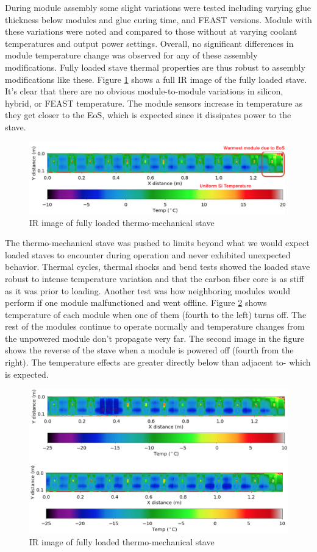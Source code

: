 During module assembly some slight variations were tested including varying glue thickness below modules and glue curing time, and FEAST versions. Module with these variations were noted and compared to those without at varying coolant temperatures and output power settings. Overall, no significant differences in module temperature change was observed for any of these assembly modifications. Fully loaded stave thermal properties are thus robust to assembly modifications like these. Figure \ref{fig:IRimagetotal} shows a full IR image of the fully loaded stave. It's clear that there are no obvious module-to-module variations in silicon, hybrid, or FEAST temperature. The module sensors increase in temperature as they get closer to the EoS, which is expected since it dissipates power to the stave.

\begin{figure}[!h]
        \centering
    \includegraphics[width=.8\textwidth]{Pictures/IRimagetotal.png}
    \caption{IR image of fully loaded thermo-mechanical stave}
    \label{fig:IRimagetotal}
\end{figure} 
 
The thermo-mechanical stave was pushed to limits beyond what we would expect loaded staves to encounter during operation and never exhibited unexpected behavior. Thermal cycles, thermal shocks and bend tests showed the loaded stave robust to intense temperature variation and that the carbon fiber core is as stiff as it was prior to loading. Another test was how neighboring modules would perform if one module malfunctioned and went offline. Figure \ref{fig:moduleoff} shows temperature of each module when one of them (fourth to the left) turns off. The rest of the modules continue to operate normally and temperature changes from the unpowered module don't propagate very far. The second image in the figure shows the reverse of the stave when a module is powered off (fourth from the right). The temperature effects are greater directly below than adjacent to- which is expected. 

\begin{figure}[!h]
        \centering
    \includegraphics[width=.7\textwidth]{Pictures/moduleoff.png}
    \caption{IR image of fully loaded thermo-mechanical stave}
    \label{fig:moduleoff}
\end{figure}

